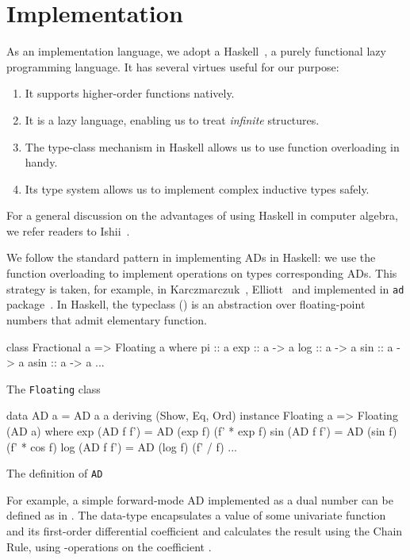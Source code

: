 \documentclass[./rims-smooth-paper.tex]{subfiles}
\begin{document}
\section{Implementation}
\label{sec:impl}
As an implementation language, we adopt a Haskell~\cite{haskell.org:2021tt}, a purely functional lazy programming language.
It has several virtues useful for our purpose:
\begin{enumerate}
\item It supports higher-order functions natively.
\item It is a lazy language, enabling us to treat \emph{infinite} structures.
\item The type-class mechanism in Haskell allows us to use function overloading in handy.
\item Its type system allows us to implement complex inductive types safely.
\end{enumerate}
For a general discussion on the advantages of using Haskell in computer algebra, we refer readers to Ishii~\cite{ISHII:2018ek}.

We follow the standard pattern in implementing ADs in Haskell: we use the function overloading to implement operations on types corresponding ADs.
This strategy is taken, for example, in Karczmarczuk~\cite{Karczmarczuk:2001ww}, Elliott~\cite{Elliott2009-beautiful-differentiation} and implemented in \texttt{ad} package~\cite{Kmett:2010aa}.
In Haskell, the  typeclass () is an abstraction over floating-point numbers that admit elementary function.
\begin{listing}[tbp]
\begin{code}
class Fractional a => Floating a where
  pi :: a
  exp :: a -> a
  log :: a -> a
  sin :: a -> a
  asin :: a -> a
  ...
\end{code}
\caption{The \texttt{Floating} class\label{lst:cls-floating}}
\end{listing}
\begin{listing}[tbp]
\begin{code}
  data AD a = AD a a deriving (Show, Eq, Ord)
  instance Floating a => Floating (AD a) where
    exp (AD f f') = AD (exp f) (f' * exp f)
    sin (AD f f') = AD (sin f) (f' * cos f)
    log (AD f f') = AD (log f) (f' / f)
    ...
\end{code}
\caption{The definition of \texttt{AD}\label{lst:def-AD}}
\end{listing}

For example, a simple forward-mode AD implemented as a dual number can be defined as in .
The data-type  encapsulates a value of some univariate function and its first-order differential coefficient and calculates the result using the Chain Rule, using -operations on the coefficient .
\end{document}
